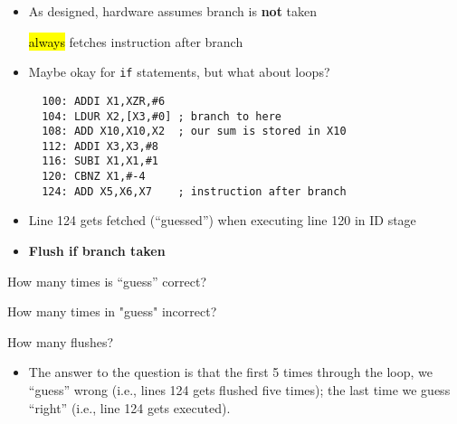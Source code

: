 \begin{frame}[fragile]
  \begin{itemize}
  \item As designed, hardware assumes branch is {\bf not} taken

    \hl{always} fetches instruction after branch
  \item Maybe okay for \texttt{if} statements, but what about loops?
{\footnotesize
\begin{verbatim}
  100: ADDI X1,XZR,#6
  104: LDUR X2,[X3,#0] ; branch to here
  108: ADD X10,X10,X2  ; our sum is stored in X10
  112: ADDI X3,X3,#8
  116: SUBI X1,X1,#1
  120: CBNZ X1,#-4
  124: ADD X5,X6,X7    ; instruction after branch
\end{verbatim}
}
\item Line 124 gets fetched (``guessed'') when executing line 120 in ID stage
\item \textbf{Flush if branch taken}
  \end{itemize}
 \begin{tcolorbox}[enhanced,attach boxed title to top center={yshift=-3mm,yshifttext=-1mm},
  colback=blue!5!white,colframe=blue!75!black,colbacktitle=blue!80!black,
  title=Think About It,fonttitle=\bfseries,
  boxed title style={size=small,colframe=red!50!black} ]
How many times is ``guess'' correct? \ifnum{}\fi

How many times in "guess" incorrect? \ifnum{}\fi

How many flushes? \ifnum{}\fi
  \end{tcolorbox}


  \BNotes\ifnum{}
  \begin{itemize}
    \item The answer to the question is that the first 5 times through the loop, we ``guess'' wrong (i.e., lines 124 gets flushed five times); the last time we guess ``right'' (i.e., line 124 gets executed).
  \end{itemize}
  \fi\ENotes
\end{frame}

